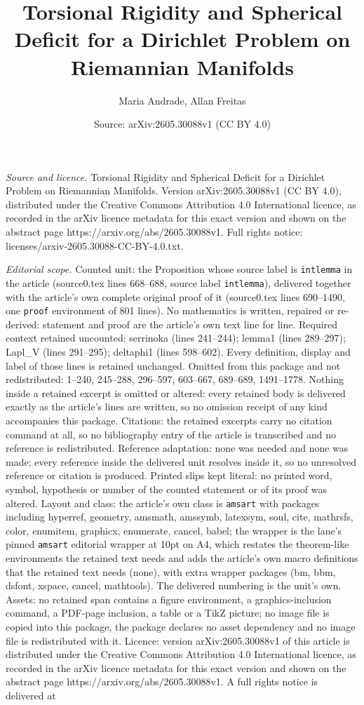 \documentclass[10pt,a4paper]{amsart}
\title[Torsional Rigidity and Spherical Deficit for a Dirichlet Pro]{Torsional Rigidity and Spherical Deficit for a Dirichlet Problem on Riemannian Manifolds}
\author{Maria Andrade, Allan Freitas}
\date{Source: arXiv:2605.30088v1 (CC BY 4.0)}
\begin{document}
\maketitle

\noindent\emph{Source and licence.} Torsional Rigidity and Spherical Deficit for a Dirichlet Problem on Riemannian Manifolds. Version arXiv:2605.30088v1 (CC BY 4.0), distributed under the Creative Commons Attribution 4.0 International licence, as recorded in the arXiv licence metadata for this exact version and shown on the abstract page https://arxiv.org/abs/2605.30088v1. Full rights notice: licenses/arxiv-2605.30088-CC-BY-4.0.txt.\par\smallskip

\noindent\textit{Editorial scope.} Counted unit: the Proposition whose source label is \texttt{intlemma} in the article (source0.tex lines 668--688, source label \texttt{intlemma}), delivered together with the article's own complete original proof of it (source0.tex lines 690--1490, one \texttt{proof} environment of 801 lines). No mathematics is written, repaired or re-derived: statement and proof are the article's own text line for line. Required context retained uncounted: serrinoka (lines 241--244); lemma1 (lines 289--297); Lapl\_V (lines 291--295); deltaphi1 (lines 598--602). Every definition, display and label of those lines is retained unchanged. Omitted from this package and not redistributed: 1--240, 245--288, 296--597, 603--667, 689--689, 1491--1778. Nothing inside a retained excerpt is omitted or altered: every retained body is delivered exactly as the article's lines are written, so no omission receipt of any kind accompanies this package. Citations: the retained excerpts carry no citation command at all, so no bibliography entry of the article is transcribed and no reference is redistributed. Reference adaptation: none was needed and none was made; every reference inside the delivered unit resolves inside it, so no unresolved reference or citation is produced. Printed slips kept literal: no printed word, symbol, hypothesis or number of the counted statement or of its proof was altered. Layout and class: the article's own class is \texttt{amsart} with packages including hyperref, geometry, amsmath, amssymb, latexsym, soul, cite, mathrsfs, color, enumitem, graphicx, enumerate, cancel, babel; the wrapper is the lane's pinned \texttt{amsart} editorial wrapper at 10pt on A4, which restates the theorem-like environments the retained text needs and adds the article's own macro definitions that the retained text needs (none), with extra wrapper packages (bm, bbm, dsfont, xspace, cancel, mathtools). The delivered numbering is the unit's own. Assets: no retained span contains a figure environment, a graphics-inclusion command, a PDF-page inclusion, a table or a TikZ picture; no image file is copied into this package, the package declares no asset dependency and no image file is redistributed with it. Licence: version arXiv:2605.30088v1 of this article is distributed under the Creative Commons Attribution 4.0 International licence, as recorded in the arXiv licence metadata for this exact version and shown on the abstract page https://arxiv.org/abs/2605.30088v1. A full rights notice is delivered at 
\end{document}
